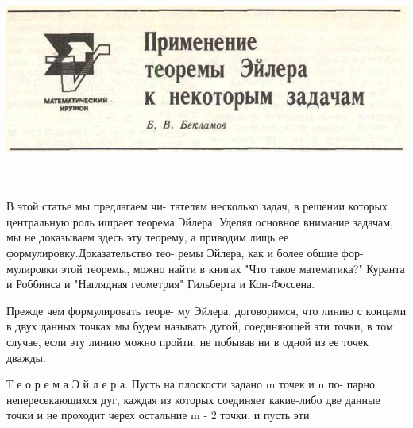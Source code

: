 \documentclass{article}
\begin{document}
\includegraphics [width=207mm,height=70mm]{pic1}


\begin{multicols}{2}
\begin{small}
\begin{justify}

\parindent15pt
В этой статье мы предлагаем чи-\linebreak
тателям несколько задач, в решении\linebreak
которых центральную роль ишрает\linebreak
теорема Эйлера. Уделяя основное\linebreak
внимание задачам, мы не доказываем\linebreak
здесь эту теорему, а приводим лищь\linebreak
ее формулировку.Доказательство тео-\linebreak
ремы Эйлера, как и более общие фор-\linebreak
мулировки этой теоремы, можно найти\linebreak
в книгах "Что такое математика?"\linebreak
Куранта и Роббинса и "Наглядная\linebreak
геометрия" Гильберта и Кон-Фоссена.

\parindent15pt
Прежде чем формулировать теоре-\linebreak
му Эйлера, договоримся, что линию\linebreak
с концами в двух данных точках мы\linebreak
будем называть дугой, соединяющей\linebreak
эти точки, в том случае, если эту\linebreak
линию можно пройти, не побывав ни\linebreak
в одной из ее точек дважды.

\parindent15pt
Т е о р е м а   Э й л е р а. Пусть\linebreak
на плоскости задано m точек и n по-\linebreak
парно непересекающихся дуг, каждая\linebreak
из которых соединяет какие-либо две\linebreak
данные точки и не проходит черех\linebreak
остальние m - 2 точки, и пусть эти\linebreak



\end{justify}
\end{small}
\end{multicols}
\end{document}
